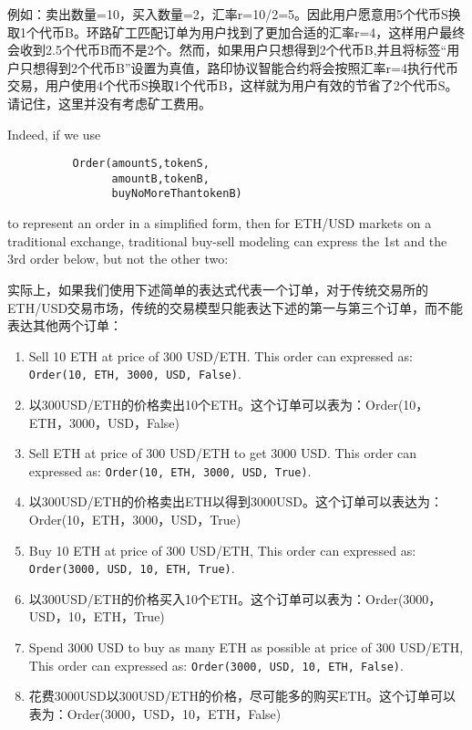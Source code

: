 \documentclass[UTF8,nofonts]{ctexart}
\begin{document}
\begin{multicols}{2}
例如：卖出数量=10，买入数量=2，汇率r=10/2=5。因此用户愿意用5个代币S换取1个代币B。环路矿工匹配订单为用户找到了更加合适的汇率r=4，这样用户最终会收到2.5个代币B而不是2个。然而，如果用户只想得到2个代币B,并且将标签“用户只想得到2个代币B”设置为真值，路印协议智能合约将会按照汇率r=4执行代币交易，用户使用4个代币S换取1个代币B，这样就为用户有效的节省了2个代币S。请记住，这里并没有考虑矿工费用。


Indeed, if we use


\begin{verbatim}
	      Order(amountS,tokenS,
	            amountB,tokenB,
	            buyNoMoreThantokenB)
\end{verbatim}

to represent an order in a simplified form, then for ETH/USD markets on a traditional exchange, traditional buy-sell modeling can express the 1st and the 3rd order below, but not the other two:


实际上，如果我们使用下述简单的表达式代表一个订单，对于传统交易所的ETH/USD交易市场，传统的交易模型只能表达下述的第一与第三个订单，而不能表达其他两个订单：



\begin{enumerate}
	\item Sell 10 ETH at price of 300 USD/ETH. This order can expressed as: \verb|Order(10, ETH, 3000, USD, False)|.
	\item 以300USD/ETH的价格卖出10个ETH。这个订单可以表为：Order(10，ETH，3000，USD，False)

	\item Sell ETH at price of 300 USD/ETH to get 3000 USD. This order can expressed as: \verb|Order(10, ETH, 3000, USD, True)|.
	\item 以300USD/ETH的价格卖出ETH以得到3000USD。这个订单可以表达为：Order(10，ETH，3000，USD，True)

	\item Buy 10 ETH at price of 300 USD/ETH, This order can expressed as: \verb|Order(3000, USD, 10, ETH, True)|.
	\item 以300USD/ETH的价格买入10个ETH。这个订单可以表为：Order(3000，USD，10，ETH，True)

	\item Spend 3000 USD to buy as many ETH as possible at price of 300 USD/ETH, This order can expressed as: \verb|Order(3000, USD, 10, ETH, False)|.
	\item 花费3000USD以300USD/ETH的价格，尽可能多的购买ETH。这个订单可以表为：Order(3000，USD，10，ETH，False)


\end{enumerate}
\end{multicols}
\end{document}
